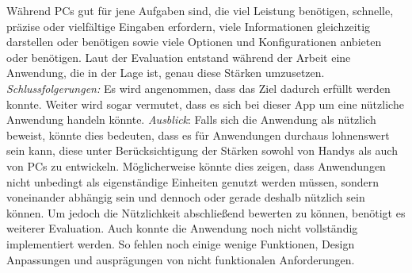 		\newline%
		Während PCs gut für jene Aufgaben sind, die viel Leistung benötigen, schnelle, präzise oder vielfältige Eingaben erfordern, viele Informationen gleichzeitig darstellen oder benötigen sowie viele Optionen und Konfigurationen anbieten oder benötigen.
	Laut der Evaluation entstand während der Arbeit eine Anwendung, die in der Lage ist, genau diese Stärken umzusetzen.
%
%
%
% 
%
\newline%
\newline%
\textit{Schlussfolgerungen:} 
Es wird angenommen, dass das Ziel dadurch erfüllt werden konnte. Weiter wird sogar vermutet, dass es sich bei dieser App um eine nützliche Anwendung handeln könnte.
%
%
%
%
%
\newline%
\newline%
\textit{Ausblick}:
		Falls sich die Anwendung als nützlich beweist, könnte dies bedeuten, dass es für Anwendungen durchaus lohnenswert sein kann, diese unter Berücksichtigung der Stärken sowohl von Handys als auch von PCs zu entwickeln. Möglicherweise könnte dies zeigen, dass Anwendungen nicht unbedingt als eigenständige Einheiten genutzt werden müssen, sondern voneinander abhängig sein und dennoch oder gerade deshalb nützlich sein können.
	\newline%
		Um jedoch die Nützlichkeit abschließend bewerten zu können, benötigt es weiterer Evaluation. %
		Auch konnte die Anwendung noch nicht vollständig implementiert werden. So fehlen noch einige wenige Funktionen, Design Anpassungen und ausprägungen von nicht funktionalen Anforderungen.